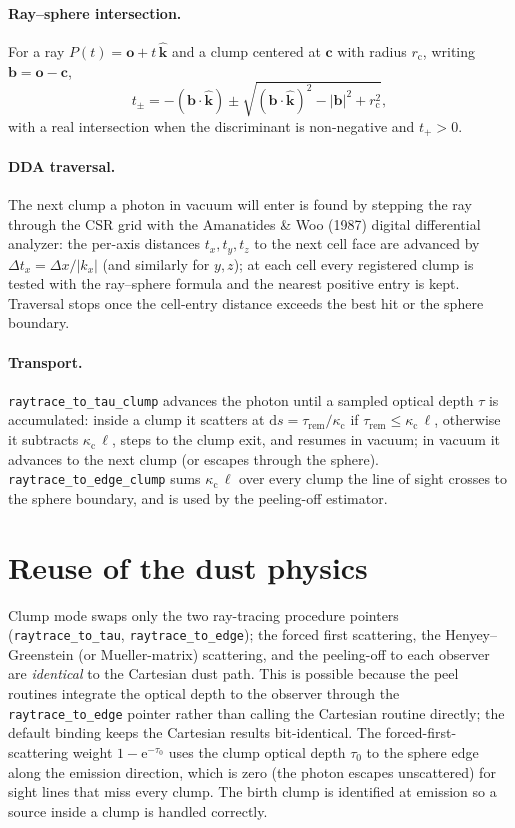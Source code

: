 \documentclass[english,a4paper]{kiseon_memo}
\newcommand{\rd}{\mathrm{d}}
\newcommand{\ee}{\mathrm{e}}
\newcommand{\kc}{\kappa_{\mathrm c}}
\newcommand{\rc}{r_{\mathrm c}}
\begin{document}
\paragraph{Ray--sphere intersection.}
For a ray $P(t)=\mathbf{o}+t\,\hat{\mathbf k}$ and a clump centered at
$\mathbf c$ with radius $\rc$, writing $\mathbf{b}=\mathbf{o}-\mathbf{c}$,
\begin{equation}
  t_{\pm} = -(\mathbf{b}\!\cdot\!\hat{\mathbf k})
            \pm\sqrt{(\mathbf{b}\!\cdot\!\hat{\mathbf k})^{2}
                     -|\mathbf{b}|^{2}+\rc^{2}} ,
\end{equation}
with a real intersection when the discriminant is non-negative and $t_{+}>0$.

\paragraph{DDA traversal.}
The next clump a photon in vacuum will enter is found by stepping the ray
through the CSR grid with the Amanatides \& Woo (1987) digital differential
analyzer: the per-axis distances $t_{x},t_{y},t_{z}$ to the next cell face are
advanced by $\Delta t_{x}=\Delta x/|k_{x}|$ (and similarly for $y,z$); at each
cell every registered clump is tested with the ray--sphere formula and the
nearest positive entry is kept.  Traversal stops once the cell-entry distance
exceeds the best hit or the sphere boundary.

\paragraph{Transport.}
\texttt{raytrace\_to\_tau\_clump} advances the photon until a sampled optical
depth $\tau$ is accumulated: inside a clump it scatters at
$\rd s=\tau_{\mathrm{rem}}/\kc$ if $\tau_{\mathrm{rem}}\le\kc\,\ell$, otherwise
it subtracts $\kc\,\ell$, steps to the clump exit, and resumes in vacuum;
in vacuum it advances to the next clump (or escapes through the sphere).
\texttt{raytrace\_to\_edge\_clump} sums $\kc\,\ell$ over every clump the
line of sight crosses to the sphere boundary, and is used by the peeling-off
estimator.

\section{Reuse of the dust physics}
Clump mode swaps only the two ray-tracing procedure pointers
(\texttt{raytrace\_to\_tau}, \texttt{raytrace\_to\_edge}); the forced first
scattering, the Henyey--Greenstein (or Mueller-matrix) scattering, and the
peeling-off to each observer are \emph{identical} to the Cartesian dust path.
This is possible because the peel routines integrate the optical depth to the
observer through the \texttt{raytrace\_to\_edge} pointer rather than calling the
Cartesian routine directly; the default binding keeps the Cartesian results
bit-identical.  The forced-first-scattering weight $1-\ee^{-\tau_{0}}$ uses the
clump optical depth $\tau_{0}$ to the sphere edge along the emission direction,
which is zero (the photon escapes unscattered) for sight lines that miss every
clump.  The birth clump is identified at emission so a source inside a clump is
handled correctly.
\end{document}
